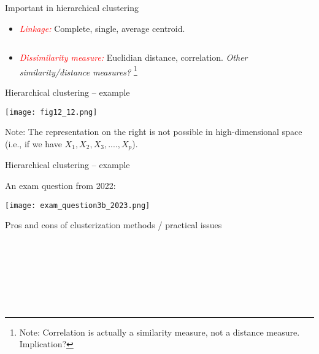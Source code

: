 \documentclass[
  10pt,
  ignorenonframetext,
]{beamer}
\providecommand{\tightlist}{%
  \setlength{\itemsep}{0pt}\setlength{\parskip}{0pt}}
\begin{document}
\begin{frame}
\begin{block}{Important in hierarchical clustering}
\protect\hypertarget{important-in-hierarchical-clustering}{}
\(~\)

\begin{itemize}
\tightlist
\item
  \emph{\textcolor{red}{Linkage:}} Complete, single, average centroid.
\end{itemize}

\(~\)

\begin{itemize}
\tightlist
\item
  \emph{\textcolor{red}{Dissimilarity measure:}} Euclidian distance,
  correlation. \emph{Other similarity/distance measures?}
  \footnote{ Note: Correlation is actually a similarity measure, not a distance measure. Implication?}
\end{itemize}
\end{block}
\end{frame}

\begin{frame}
\begin{block}{Hierarchical clustering -- example}
\protect\hypertarget{hierarchical-clustering-example}{}
\(~\)

\texttt{[image: fig12\_12.png]}

Note: The representation on the right is not possible in
high-dimensional space (i.e., if we have \(X_1, X_2, X_3, ...., X_p\)).
\end{block}
\end{frame}

\begin{frame}
\begin{block}{Hierarchical clustering -- example}
\protect\hypertarget{hierarchical-clustering-example-1}{}
\(~\)

An exam question from 2022:

\texttt{[image: exam\_question3b\_2023.png]}
\end{block}
\end{frame}

\begin{frame}
\begin{block}{Pros and cons of clusterization methods / practical
issues}
\protect\hypertarget{pros-and-cons-of-clusterization-methods-practical-issues}{}
\(~\)

\(~\)

\(~\)

\(~\)

\(~\)

\(~\)

\(~\)

\(~\)

\(~\)

\(~\)
\end{block}
\end{frame}
\end{document}
